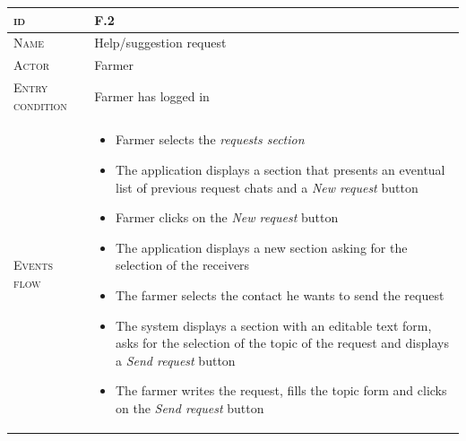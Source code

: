 
\begin{table}[H]
    \centering
    \begin{tabular}{|l|m{}|}
        \hline %
    	\textsc{id}                 &   F.2\\
    	\hline %
    	\textsc{Name}               &   Help/suggestion request\\
    	\hline %
    	\textsc{Actor}             &   Farmer\\
    	\hline %
    	\textsc{Entry condition}   &   Farmer has logged in\\
    	\hline %
    	\textsc{Events flow}         &   %
            	                        \begin{itemize}
                                    	    \item Farmer selects the \textit{requests section}
                                    		\item The application displays a section that presents an eventual list of previous request chats and a \textit{New request} button
                                    		\item Farmer clicks on the \textit{New request} button
                                    		\item The application displays a new section asking for the selection of the receivers
                                    		\item The farmer selects the contact he wants to send the request
                                    		\item The system displays a section with an editable text form, asks for the selection of the topic of the request and displays a \textit{Send request} button
                                    		\item The farmer writes the request, fills the topic form and clicks on the \textit{Send request} button
                                        \end{itemize}\\
        \hline %

\end{tabular}
\end{table}
